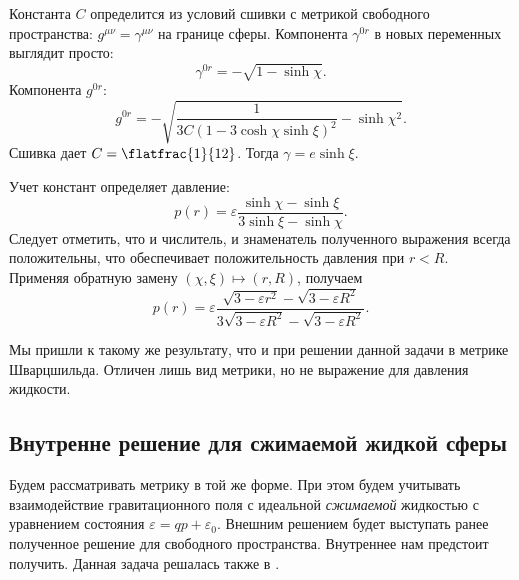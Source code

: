 \documentclass[\docroot/reports/draft/report.tex]{subfiles}
\begin{document}
    Константа $C$ определится из условий сшивки с метрикой свободного пространства: $g^{\mu\nu} = \gamma^{\mu\nu}$ на границе сферы. Компонента $\gamma^{0r}$ в новых переменных выглядит просто:
    \begin{equation*}
        \gamma^{0r} = - \sqrt{1 - \sinh\chi} .
    \end{equation*}
    Компонента $g^{0r}$:
    \begin{equation*}
        g^{0r} = - \sqrt{
            \frac{1}{3 C (1 - 3 \cosh\chi \sinh\xi)^2} - \sinh\chi^2
        } .
    \end{equation*}
    Сшивка дает $C = \flatfrac{1}{12}$. Тогда $\gamma = e \sinh\xi$.

    Учет констант определяет давление:
    \begin{equation*}
        p(r) = \varepsilon \frac{\sinh\chi - \sinh\xi}{3\sinh\xi - \sinh\chi} .
    \end{equation*}
    Следует отметить, что и числитель, и знаменатель полученного выражения всегда положительны, что обеспечивает положительность давления при $r < R$. Применяя обратную замену $(\chi,\xi) \mapsto (r,R)$, получаем
    \begin{equation*}
        p(r) = \varepsilon \frac{\sqrt{3 - \varepsilon r^2} - \sqrt{3 - \varepsilon R^2}}{3 \sqrt{3 - \varepsilon R^2} - \sqrt{3 - \varepsilon R^2}} .
    \end{equation*}

    Мы пришли к такому же результату, что и при решении данной задачи в метрике Шварцшильда. Отличен лишь вид метрики, но не выражение для давления жидкости.

\subsection{Внутренне решение для сжимаемой жидкой сферы}

    Будем рассматривать метрику в той же форме. При этом будем учитывать взаимодействие гравитационного поля с идеальной \textit{сжимаемой} жидкостью с уравнением состояния $\varepsilon = q p + \varepsilon_0$. Внешним решением будет выступать ранее полученное решение для свободного пространства. Внутреннее нам предстоит получить. Данная задача решалась также в \cite{burlankov_new_phys}.
\end{document}
